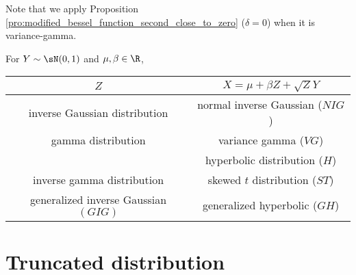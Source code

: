 \begin{center}
\begin{tabular}{cccc}

\hline
\end{tabular}
Note that we apply Proposition \ref{pro:modified_bessel_function_second_close_to_zero} ($\delta = 0$) when it is variance-gamma.
\end{center}


For $Y\sim \sN(0,1)$ and $\mu,\beta\in \R$,
\begin{center}
\begin{tabular}{cc}
\hline
$Z$ & $X = \mu+\beta Z +\sqrt{Z}Y$ \\ \hline

inverse Gaussian distribution & normal inverse Gaussian ($NIG$)\\

gamma distribution & variance gamma ($VG$) \\

 & hyperbolic distribution ($H$)\\

inverse gamma distribution & skewed $t$ distribution ($ST$)\\

generalized inverse Gaussian $(GIG)$ & generalized hyperbolic ($GH$)\\

\hline
\end{tabular}
\end{center}





\section{Truncated distribution}

